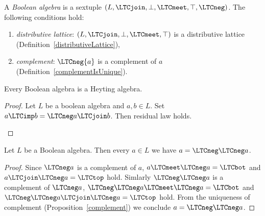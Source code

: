 \begin{definition} 
A {\em Boolean algebra} is a sextuple  
$(L,\LTCjoin,\bot,\LTCmeet,\top,\LTCneg)$.
The following conditions hold:
\begin{enumerate}
\item {\em distributive lattice}: 
$(L,\LTCjoin,\bot,\LTCmeet,\top)$ is a  distributive lattice
 (Definition~\ref{distributiveLattice}),
\item {\em complement}:
 $\LTCneg{a}$ is a complement of $a$ (Definition~\ref{complementIsUnique}).
\end{enumerate}
\end{definition}

\begin{proposition} 
Every Boolean algebra is a Heyting algebra.
\end{proposition}
\begin{proof}
Let  $L$ be a boolean algebra and $a,b \in L$. Set $a \LTCimp b = \LTCneg a \LTCjoin b$. Then residual law holds.
\begin{prooftree}
\end{prooftree}
\begin{prooftree}
\end{prooftree}
\end{proof}

\begin{proposition}\label{doubleNegationElimination}
Let $L$ be a Boolean algebra. Then every $a \in L$ we have $a = \LTCneg\LTCneg a$. 
\end{proposition}
\begin{proof}
Since $\LTCneg a$ is a complement of $a$, 
$a \LTCmeet \LTCneg a = \LTCbot$ and $a \LTCjoin \LTCneg a = \LTCtop$ hold. 
Simlarly  $\LTCneg\LTCneg a$ is a complement of $\LTCneg a$, 
$\LTCneg\LTCneg a \LTCmeet \LTCneg a = \LTCbot$ and $\LTCneg\LTCneg a \LTCjoin \LTCneg a = \LTCtop$ hold.
From the uniqueness of complement (Proposition~\ref{complement}) we conclude $ a = \LTCneg\LTCneg a$. 
\end{proof}

